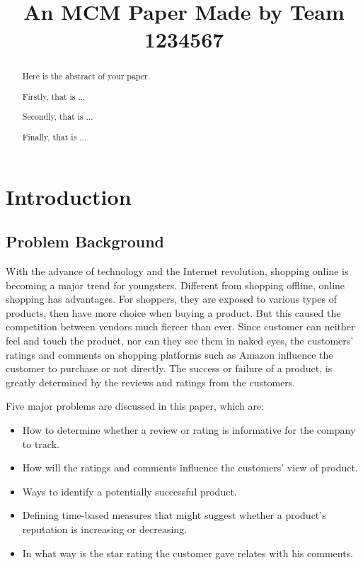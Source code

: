 \documentclass[12pt]{article}  %
\title{An MCM Paper Made by Team 1234567}  %
\begin{document}
\begin{abstract}
    Here is the abstract of your paper.

    Firstly, that is ...

    Secondly, that is ...

    Finally, that is ...


\end{abstract}

\maketitle  %
\tableofcontents  %


\section{Introduction}
\subsection{Problem Background}
With the advance of technology and the Internet revolution, shopping online is becoming a major trend for youngsters. Different from shopping offline, online shopping has advantages. For shoppers, they are exposed to various types of products, then have more choice when buying a product. But this caused the competition between vendors much fiercer than ever. Since customer can neither feel and touch the product, nor can they see them in naked eyes, the customers' ratings and comments on shopping platforms such as Amazon influence the customer to purchase or not directly. The success or failure of a product, is greatly determined by the reviews and ratings from the customers.
\newline

\noindent
Five major problems are discussed in this paper, which are:
\begin{itemize}
    \item How to determine whether a review or rating is informative for the company to track.
    \item How will the ratings and comments influence the customers' view of product.
    \item Ways to identify a potentially successful product.
    \item Defining time-based measures that might suggest whether a product's reputation is increasing or decreasing.
    \item In what way is the star rating the customer gave relates with his comments.
      
      
\end{itemize}
\end{document}

